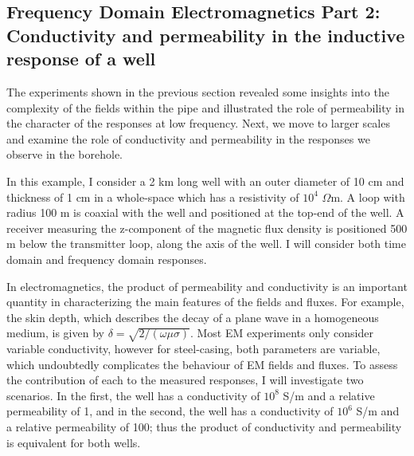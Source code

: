 




\subsection{Frequency Domain Electromagnetics Part 2: Conductivity and permeability in the inductive response of a well}
\label{sec:FDEM_part2}

The experiments shown in the previous section revealed some insights into the complexity of the fields within the pipe and illustrated the role of permeability in the character of the responses at low frequency. Next, we move to larger scales and examine the role of conductivity and permeability in the responses we observe in the borehole.

In this example, I consider a 2 km long well with an outer diameter of 10 cm and thickness of 1 cm in a whole-space which has a resistivity of $10^4$ $\Omega$m. A loop with radius 100 m is coaxial with the well and positioned at the top-end of the well. A receiver measuring the z-component of the magnetic flux density is positioned 500 m below the transmitter loop, along the axis of the well. I will consider both time domain and frequency domain responses.

In electromagnetics, the product of permeability and conductivity is an important quantity in characterizing the main features of the fields and fluxes. For example, the skin depth, which describes the decay of a plane wave in a homogeneous medium, is given by $\delta = \sqrt{2/(\omega \mu \sigma)}$. Most EM experiments only consider variable conductivity, however for steel-casing, both parameters are variable, which undoubtedly complicates the behaviour of EM fields and fluxes.
To assess the contribution of each to the measured responses, I will investigate two scenarios. In the first, the well has a conductivity of $10^8$ S/m and a relative permeability of 1, and in the second, the well has a conductivity of $10^6$ S/m and a relative permeability of 100; thus the product of conductivity and permeability is equivalent for both wells.

